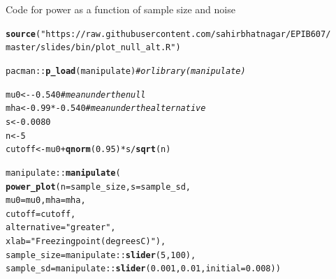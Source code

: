 \documentclass[10pt]{beamer}\usepackage[]{graphicx}\usepackage[]{color}
\makeatletter
\newcommand{\hlnum}[1]{\textcolor[rgb]{0.686,0.059,0.569}{#1}}%
\newcommand{\hlstr}[1]{\textcolor[rgb]{0.192,0.494,0.8}{#1}}%
\newcommand{\hlcom}[1]{\textcolor[rgb]{0.678,0.584,0.686}{\textit{#1}}}%
\newcommand{\hlopt}[1]{\textcolor[rgb]{0,0,0}{#1}}%
\newcommand{\hlstd}[1]{\textcolor[rgb]{0.345,0.345,0.345}{#1}}%
\newcommand{\hlkwb}[1]{\textcolor[rgb]{0.69,0.353,0.396}{#1}}%
\newcommand{\hlkwc}[1]{\textcolor[rgb]{0.333,0.667,0.333}{#1}}%
\newcommand{\hlkwd}[1]{\textcolor[rgb]{0.737,0.353,0.396}{\textbf{#1}}}%
\newenvironment{kframe}{%
 \def\at@end@of@kframe{}%
 \ifinner\ifhmode%
  \def\at@end@of@kframe{\end{minipage}}%
  \begin{minipage}{\columnwidth}%
 \fi\fi%
 \def\FrameCommand##1{\hskip\@totalleftmargin \hskip-\fboxsep
 \colorbox{shadecolor}{##1}\hskip-\fboxsep
     \hskip-\linewidth \hskip-\@totalleftmargin \hskip\columnwidth}%
 \MakeFramed {\advance\hsize-\width
   \@totalleftmargin\z@ \linewidth\hsize
   \@setminipage}}%
 {\par\unskip\endMakeFramed%
 \at@end@of@kframe}
\newenvironment{knitrout}{}{} %
\makeatother
\begin{document}
\begin{frame}[fragile]{Code for power as a function of sample size and noise}
\begin{knitrout}\tiny
{}\color{fgcolor}\begin{kframe}
\begin{alltt}
\hlkwd{source}\hlstd{(}\hlstr{"https://raw.githubusercontent.com/sahirbhatnagar/EPIB607/
        master/slides/bin/plot_null_alt.R"}\hlstd{)}

\hlstd{pacman}\hlopt{::}\hlkwd{p_load}\hlstd{(manipulate)} \hlcom{# or library(manipulate)}

\hlstd{mu0} \hlkwb{<-} \hlopt{-}\hlnum{0.540} \hlcom{# mean under the null}
\hlstd{mha} \hlkwb{<-} \hlnum{0.99}\hlopt{*-}\hlnum{0.540} \hlcom{# mean under the alternative}
\hlstd{s} \hlkwb{<-} \hlnum{0.0080}
\hlstd{n} \hlkwb{<-} \hlnum{5}
\hlstd{cutoff} \hlkwb{<-} \hlstd{mu0} \hlopt{+} \hlkwd{qnorm}\hlstd{(}\hlnum{0.95}\hlstd{)} \hlopt{*} \hlstd{s} \hlopt{/} \hlkwd{sqrt}\hlstd{(n)}

\hlstd{manipulate}\hlopt{::}\hlkwd{manipulate}\hlstd{(}
\hlkwd{power_plot}\hlstd{(}\hlkwc{n} \hlstd{= sample_size,} \hlkwc{s} \hlstd{= sample_sd,}
\hlkwc{mu0} \hlstd{= mu0,} \hlkwc{mha} \hlstd{= mha,}
\hlkwc{cutoff} \hlstd{= cutoff,}
\hlkwc{alternative} \hlstd{=} \hlstr{"greater"}\hlstd{,}
\hlkwc{xlab} \hlstd{=} \hlstr{"Freezing point (degrees C)"}\hlstd{),}
\hlkwc{sample_size} \hlstd{= manipulate}\hlopt{::}\hlkwd{slider}\hlstd{(}\hlnum{5}\hlstd{,} \hlnum{100}\hlstd{),}
\hlkwc{sample_sd} \hlstd{= manipulate}\hlopt{::}\hlkwd{slider}\hlstd{(}\hlnum{0.001}\hlstd{,} \hlnum{0.01}\hlstd{,} \hlkwc{initial} \hlstd{=} \hlnum{0.008}\hlstd{))}
\end{alltt}
\end{kframe}
\end{knitrout}
\end{frame}
\end{document}
